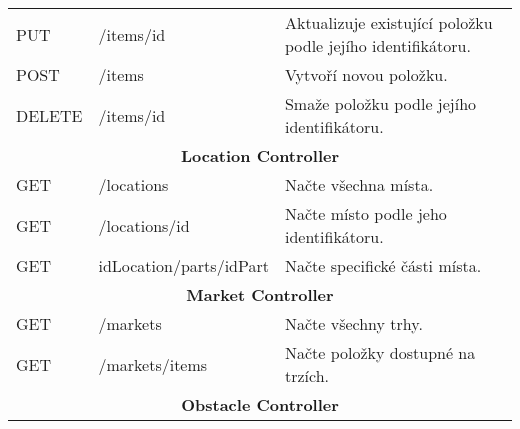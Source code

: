\begin{longtable}{|l|l|p{}|}
    PUT             & /items/{id}                 & Aktualizuje existující položku podle jejího identifikátoru.                                                                                \\
    POST            & /items                      & Vytvoří novou položku.                                                                                                                     \\
    DELETE          & /items/{id}                 & Smaže položku podle jejího identifikátoru.                                                                                                 \\
    \hline
    \multicolumn{3}{|c|}{\textbf{Location Controller}}                                                                                                                                         \\
    \hline
    GET             & /locations                  & Načte všechna místa.                                                                                                                       \\
    GET             & /locations/{id}             & Načte místo podle jeho identifikátoru.                                                                                                     \\
    GET             & {idLocation}/parts/{idPart} & Načte specifické části místa.                                                                                                              \\%
    \hline
    \multicolumn{3}{|c|}{\textbf{Market Controller}}                                                                                                                                           \\
    \hline
    GET             & /markets                    & Načte všechny trhy.                                                                                                                        \\
    GET             & /markets/items              & Načte položky dostupné na trzích.                                                                                                          \\
    \hline
    \multicolumn{3}{|c|}{\textbf{Obstacle Controller}}                                                                                                                                         \\

\end{longtable}
